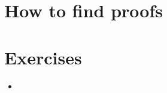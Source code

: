 \documentclass{beamer}
\begin{document}

\section{How to find proofs}

\section{Exercises}

\begin{frame}{}
\begin{itemize}
	\item 
\end{itemize}
\end{frame}
\end{document}
